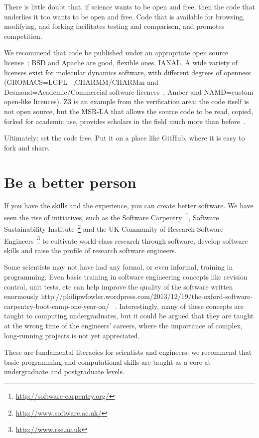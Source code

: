 \documentclass[conference]{IEEEtran}
\begin{document}
There is little doubt that, if science wants to be open and free,
then the code that underlies it too wants to be open and free. Code
that is available for browsing, modifying, and forking facilitates
testing and comparison, and promotes competition.

We recommend that code be published under an appropriate open source
license~\cite{osl}; BSD and Apache are good, flexible ones.%
IANAL.  A wide variety of licenses exist for molecular dynamics
software, with different degrees of openness
(GROMACS=LGPL~\cite{Hess2008} ,CHARMM/CHARMm and
Desmond=Academic/Commercial software
licences~\cite{Brooks2009,Bowers2006}, Amber and NAMD=custom open-like
licences). Z3 is an example from the verification area: the code
itself is not open source, but the MSR-LA that allows the source code
to be read, copied, forked for academic use, provides scholars in the
field much more than before~\cite{deMoura2012Z3open}.

Ultimately: set the code free. Put it on a place like GitHub, where it
is easy to fork and share.


\section{Be a better person}

If you have the skills and the experience, you can create better
software. We have seen the rise of initiatives, such as the Software
Carpentry~\footnote{\url{http://software-carpentry.org/}}, Software
Sustainability Institute~\footnote{\url{http://www.software.ac.uk/}}
and the UK Community of Research Software
Engineers~\footnote{\url{http://www.rse.ac.uk}} to cultivate
world-class research through software, develop software skills and
raise the profile of research software engineers.

Some scientists may not have had any formal, or even informal,
training in programming. Even basic training in software engineering
concepts like revision control, unit tests, etc can help improve the
quality of the software written enormously
http://philipwfowler.wordpress.com/2013/12/19/the-oxford-software-carpentry-boot-camp-one-year-on/
~\cite{Wilson2014}.  Interestingly, many of these concepts are taught
to computing undergraduates, but it could be argued that they are
taught at the wrong time of the engineers' careers, where the
importance of complex, long-running projects is not yet appreciated.

These are fundamental literacies for scientists and engineers: we
recommend that basic programming and computational skills are taught
as a core at undergraduate and postgraduate levels.
\end{document}
